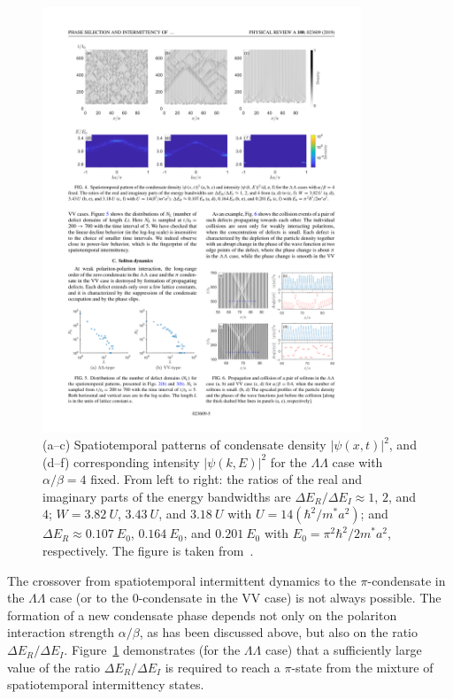 \begin{figure}[ht]
\centering
\includegraphics[width=0.85\textwidth]{Fig/Ch4/fig4.pdf}
\caption[Comparing spatiotemporal patterns with fixed nonlinearity]{(a--c) Spatiotemporal patterns of condensate density $|\psi(x,t)|^2$, and (d--f) corresponding intensity $|\psi(k,E)|^2$ for the $\Lambda\Lambda$ case with $\alpha/\beta = 4$ fixed. From left to right: the ratios of the real and imaginary parts of the energy bandwidths are ${\Delta}E_R/{\Delta}E_I \approx 1$, $2$, and $4$; $W = 3.82~U$, $3.43~U$, and $3.18~U$ with $U=14(\hbar^2/m^* a^2)$; and $\Delta E_R \approx  0.107~E_0$, $0.164~E_0$, and $0.201~E_0$ with $E_0=\pi^2\hbar^2/2m^*a^2$, respectively. The figure is taken from~\cite{Yoon:2019aa}.}
\label{CH4_fig:3-1}
\end{figure}

The crossover from spatiotemporal intermittent dynamics to the $\pi$-condensate in the $\Lambda\Lambda$ case (or to the $0$-condensate in the VV case) is not always possible.
The formation of a new condensate phase depends not only on the polariton interaction strength $\alpha/\beta$, as has been discussed above, but also on the ratio ${\Delta}E_R/{\Delta}E_I$.
Figure~\ref{CH4_fig:3-1} demonstrates (for the $\Lambda\Lambda$ case) that a sufficiently large value of the ratio ${\Delta}E_R/{\Delta}E_I$ is required to reach a $\pi$-state from the mixture of spatiotemporal intermittency states.

